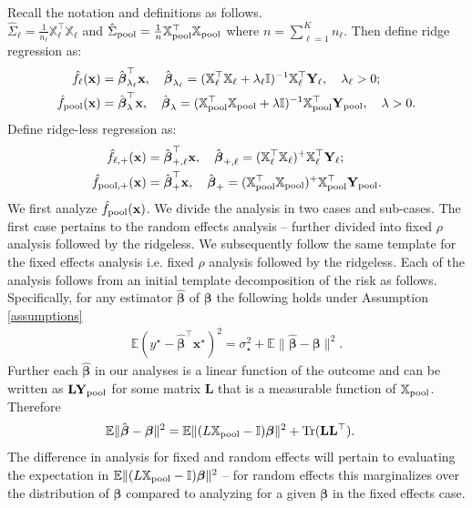 \documentclass{article}
\theoremstyle{plain}
\theoremstyle{remark}
\def \bbeta{\boldsymbol{\beta}}
\def \bx{\mathbf{x}}
\def \bbeta{\boldsymbol{\beta}}
\def \tr {\mathrm{Tr}}
\def \I{\mathcal{I}}
\def \E{\mathbb{E}}
\def \I {\mathbb{I}}
\begin{document}
Recall the notation and definitions as follows.\\
$\hat{\Sigma}_{\ell}=\frac{1}{n_\ell}\mathbb{X}_{\ell}^\top\mathbb{X}_{\ell}$ and $\hat{\Sigma}_{\rm pool}= \frac{1}{n}\mathbb{X}_{\rm pool}^\top \mathbb{X}_{\rm pool}$ where $n=\sum\limits_{\ell=1}^Kn_{\ell}$. Then define ridge regression as:
\begin{align*}
    \hat{f}_{\ell}(\bx)&=\hat{\boldsymbol{\beta}}_{\lambda_{\ell}}^{\top}\bx,\quad \hat{\boldsymbol{\beta}}_{\lambda_{\ell}}=(\mathbb{X}_{\ell}^\top\mathbb{X}_{\ell}+\lambda_{\ell}\mathbb{I})^{-1}\mathbb{X}_{\ell}^{\top}\mathbf{Y}_{\ell},\quad \lambda_{\ell}>0;\\
    \hat{f}_{\rm pool}(\bx)&=\hat{\boldsymbol{\beta}}_{\lambda}^{\top}\bx,\quad \hat{\boldsymbol{\beta}}_{\lambda}=(\mathbb{X}_{\rm pool}^\top\mathbb{X}_{\rm pool}+\lambda\mathbb{I})^{-1}\mathbb{X}_{\rm pool}^{\top}\mathbf{Y}_{\rm pool},\quad \lambda>0.
\end{align*}
Define ridge-less regression as:
\begin{align*}
    \hat{f}_{\ell,+}(\bx)&=\hat{\boldsymbol{\beta}}_{+,\ell}^{\top}\bx,\quad \hat{\boldsymbol{\beta}}_{+,\ell}=(\mathbb{X}_{\ell}^\top\mathbb{X}_{\ell})^{+}\mathbb{X}_{\ell}^{\top}\mathbf{Y}_{\ell};\\
    \hat{f}_{\rm pool, +}(\bx)&=\hat{\boldsymbol{\beta}}_{+}^{\top}\bx,\quad \hat{\boldsymbol{\beta}}_{+}=(\mathbb{X}_{\rm pool}^\top\mathbb{X}_{\rm pool})^{+}\mathbb{X}_{\rm pool}^{\top}\mathbf{Y}_{\rm pool}.
\end{align*}
We first analyze $ \hat{f}_{\rm pool}(\bx)$. We divide the analysis in two cases and sub-cases. The first case pertains to the random effects analysis -- further divided into fixed $\rho$ analysis followed by the ridgeless. We subsequently follow the same template for the fixed effects analysis i.e. fixed $\rho$ analysis followed by the ridgeless. Each of the analysis follows from an initial template decomposition of the risk as follows. Specifically,  for any estimator $\hat{\bbeta}$ of $\bbeta$ the following holds under Assumption \ref{assumptions}
\begin{align*}
    \E(y^\star-\hat{\bbeta}^\top\bx^\star)^2=\sigma_{\star}^2+\E\|\hat{\bbeta}-\bbeta\|^2.
\end{align*}
Further each $\hat{\bbeta}$ in our analyses is a linear function of the outcome and can be written as $\mathbf{L}\mathbf{Y}_{\rm pool}$ for some matrix $\mathbf{L}$ that is a measurable function of $\mathbb{X}_{\rm pool}$. Therefore
\begin{align*}
\E\|\hat{\bbeta}-\bbeta\|^2&=\E\|(L\mathbb{X}_{\rm pool}-\I)\bbeta\|^2+\tr(\mathbf{L}\mathbf{L}^\top).
    \end{align*}
The difference in analysis for fixed and random effects will pertain to evaluating the expectation in $\E\|(L\mathbb{X}_{\rm pool}-\I)\bbeta\|^2$ -- for random effects this marginalizes over the distribution of $\bbeta$ compared to analyzing for a given $\bbeta$ in the fixed effects case. 
\end{document}
